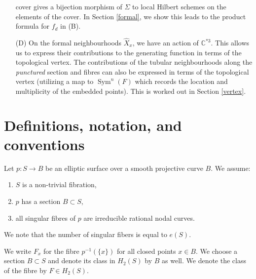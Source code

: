 \documentclass{amsart}
\theoremstyle{definition}
\newcommand{\CC} {\mathbb{C}}          %
\newcommand{\PP} {\mathbb{P}}
\newcommand{\Sym}{\operatorname{Sym}}
\newcommand{\Xhat}{\widehat{X}}
\begin{document}
\begin{enumerate}
cover gives a bijection morphism of $\Sigma$ to local Hilbert
schemes on the elements of the cover. In Section \ref{formal}, we show
this leads to the product formula for $f_d$ in (B).
\item[(D)] On the formal neighbourhoods $\Xhat _x$, we have an action
of $\CC^{*3}$. This allows us to express their contributions to the
generating function in terms of the topological vertex. The
contributions of the tubular neighbourhoods along the \emph{punctured}
section and fibres can also be expressed in terms of the topological
vertex (utilizing a map to $\Sym^{n}(F)$ which records the location
and multiplicity of the embedded points). This is worked out in
Section \ref{vertex}.
\end{enumerate}



\section{Definitions, notation, and conventions}

Let $p : S \rightarrow B$ be an elliptic surface over a smooth
projective curve $B$. We assume:
\begin{enumerate}
\item $S$ is a non-trivial fibration,
\item $p$ has a section $B \subset S$,
\item all singular fibres of $p$ are irreducible rational nodal curves. 
\end{enumerate}
We note that the number of singular fibers is equal to $e(S)$.

We write $F_x$ for the fibre $p^{-1}(\{x\})$ for all closed points $x
\in B$. We choose a section $B \subset S$ and denote its class in
$H_2(S)$ by $B$ as well. We denote the class of the fibre by $F \in
H_2(S)$.

\end{document}
